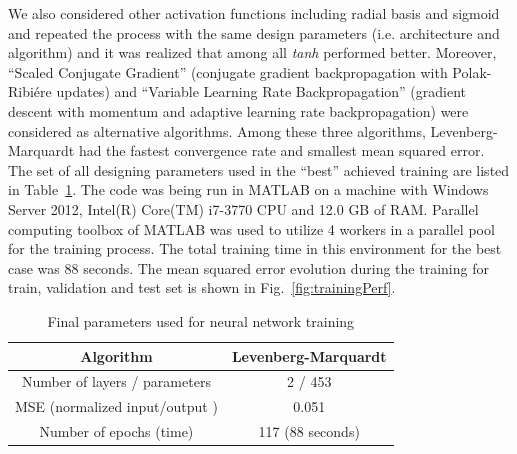 \documentclass[twocolumn,10pt]{asme2e}
\begin{document}
We also considered other activation functions including radial basis and sigmoid and repeated the process with the same design parameters (i.e. architecture and algorithm) and it was realized that among all \textit{tanh} performed better. Moreover, ``Scaled Conjugate Gradient'' (conjugate gradient backpropagation with Polak-Ribiére updates) \cite{moller1993scaled} and ``Variable Learning Rate Backpropagation'' (gradient descent with momentum and adaptive learning rate backpropagation) were considered as alternative algorithms. Among these three algorithms, Levenberg-Marquardt had the fastest convergence rate and smallest mean squared error. The set of all designing parameters used in the ``best'' achieved training are listed in Table~\ref{tab:param}. The code was being run in MATLAB on a machine with Windows Server 2012, Intel(R) Core(TM) i7-3770 CPU and 12.0 GB of RAM. Parallel computing toolbox of MATLAB was used to utilize 4 workers in a parallel pool for the training process. The total training time in this environment for the best case was 88 seconds. The mean squared error evolution during the training for train, validation and test set is shown in Fig.~\ref{fig:trainingPerf}.

\begin{table}[t]
	\centering

	\caption{Final parameters used for neural network training}
\begin{tabular}{c|c}	
	\hline
	\hline Algorithm & Levenberg-Marquardt \\ 
	\hline Number of layers / parameters & 2 / 453 \\ 
	\hline MSE (normalized input/output ) & 0.051 \\ 
	\hline Number of epochs (time) & 117 (88 seconds) \\ 
	\hline  	 
\end{tabular} \label{tab:param}
\end{table}
\end{document}

